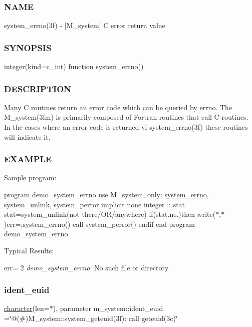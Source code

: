 \subsubsection*{N\+A\+ME}

system\+\_\+errno(3f) -\/ \mbox{[}M\+\_\+system\mbox{]} C error return value \subsubsection*{S\+Y\+N\+O\+P\+S\+IS}

integer(kind=c\+\_\+int) function system\+\_\+errno()

\subsubsection*{D\+E\+S\+C\+R\+I\+P\+T\+I\+ON}

Many C routines return an error code which can be queried by errno. The M\+\_\+system(3fm) is primarily composed of Fortran routines that call C routines. In the cases where an error code is returned vi system\+\_\+errno(3f) these routines will indicate it.

\subsubsection*{E\+X\+A\+M\+P\+LE}

Sample program\+:

program demo\+\_\+system\+\_\+errno use M\+\_\+system, only\+: \hyperlink{interfacem__system_1_1system__errno}{system\+\_\+errno}, system\+\_\+unlink, system\+\_\+perror implicit none integer \+:\+: stat stat=system\+\_\+unlink(\textquotesingle{}not there/\+O\+R/anywhere\textquotesingle{}) if(stat.\+ne.)then write($\ast$,$\ast$)\textquotesingle{}err=\textquotesingle{},system\+\_\+errno() call system\+\_\+perror(\textquotesingle{}) endif end program demo\+\_\+system\+\_\+errno

Typical Results\+:

err= 2 {\itshape demo\+\_\+system\+\_\+errno}\+: No such file or directory \mbox{\label{namespacem__system_a20fffb77817fdd355846c7d6f21f5a15}} 
\subsubsection{\texorpdfstring{ident\+\_\+euid}{ident\_euid}}
{\footnotesize\ttfamily \hyperlink{option__stopwatch_83_8txt_abd4b21fbbd175834027b5224bfe97e66}{character}(len=$\ast$), parameter m\+\_\+system\+::ident\+\_\+euid =\char`\"{}@(\#)M\+\_\+system\+::system\+\_\+geteuid(3f)\+: call geteuid(3c)\char`\"{}\hspace{0.3cm}{\ttfamily [private]}}



